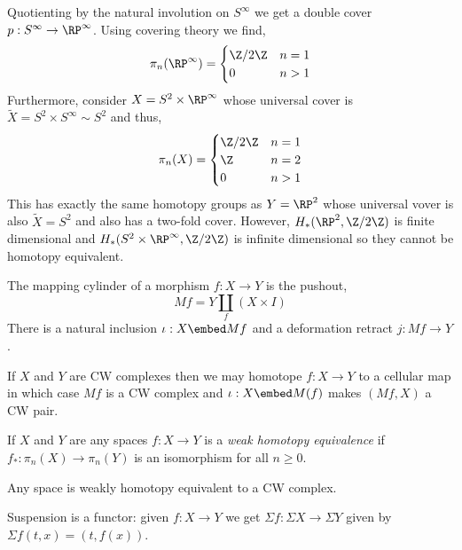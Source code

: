 \documentclass[12pt]{extarticle}
\begin{document}
\begin{example}
Quotienting by the natural involution on $S^\infty$ we get a double cover $p : S^\infty \to \RP^{\infty}$. Using covering theory we find,
\[ \pi_n(\RP^\infty) 
= \begin{cases}
\Z / 2 \Z & n = 1
\\
0 & n > 1
\end{cases} \]
Furthermore, consider $X = S^2 \times \RP^\infty$ whose universal cover is $\tilde{X} = S^2 \times S^{\infty} \sim S^2$ and thus,
\[ \pi_n(X) 
= \begin{cases}
\Z / 2 \Z & n = 1
\\
\Z & n = 2
\\
0 & n > 1
\end{cases} \]
This has exactly the same homotopy groups as $Y = \RP^2$ whose universal vover is also $\tilde{X} = S^2$ and also has a two-fold cover. However, 
$H_*(\RP^2, \Z / 2 \Z)$ is finite dimensional and $H_*(S^2 \times \RP^\infty, \Z / 2 \Z)$ is infinite dimensional so they cannot be homotopy equivalent. 
\end{example}


\begin{definition}
The mapping cylinder of a morphism $f : X \to Y$ is the pushout,
\[ Mf = Y \coprod_f (X \times I) \]
There is a natural inclusion $\iota : X \embed Mf$ and a deformation retract $j : Mf \to Y$.  
\end{definition}

\begin{remark}
If $X$ and $Y$ are CW complexes then we may homotope $f : X \to Y$ to a cellular map in which case $Mf$ is a CW complex and $\iota : X \embed M(f)$ makes $(Mf, X)$ a CW pair. 
\end{remark}

\begin{definition}
If $X$ and $Y$ are any spaces $f : X \to Y$ is a \textit{weak homotopy equivalence} if $f_* : \pi_n(X) \to \pi_n(Y)$ is an isomorphism for all $n \ge 0$. 
\end{definition}

\begin{theorem}
Any space is weakly homotopy equivalent to a CW complex. 
\end{theorem}

\begin{remark}
Suspension is a functor: given $f : X \to Y$ we get $\Sigma f : \Sigma X \to \Sigma Y$ given by $\Sigma f(t, x) = (t, f(x))$. 
\end{remark}
\end{document}
